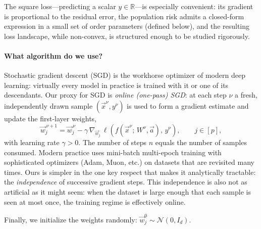 The square loss---predicting a scalar $y \in \mathbb{R}$---is especially convenient:
its gradient is proportional to the residual error, the population risk admits a
closed-form expression in a small set of order parameters (defined below), and the
resulting loss landscape, while non-convex, is structured enough to be studied
rigorously.

\paragraph{What algorithm do we use?}
Stochastic gradient descent (SGD) is the workhorse optimizer of modern deep
learning: virtually every model in practice is trained with it or one of its
descendants.
Our proxy for SGD is \emph{online (one-pass) SGD}: at each step $\nu$ a fresh,
independently drawn sample $(\vec{x}^\nu, y^\nu)$ is used to form a gradient
estimate and update the first-layer weights,
\begin{equation}
\label{eq:intro:sgd}
    \vec{w}_j^{\,\nu+1} = \vec{w}_j^{\,\nu}
    - \gamma\,\nabla_{\vec{w}_j}\,\ell\!\left(
        f(\vec{x}^\nu;\, W^\nu, \vec{a}),\, y^\nu\right),
    \qquad j \in [p],
\end{equation}
with learning rate $\gamma > 0$.
The number of steps $n$ equals the number of samples consumed.
Modern practice uses mini-batch multi-epoch training with sophisticated optimizers
(Adam, Muon, etc.) on datasets that are revisited many times.
Ours is simpler in the one key respect that makes it analytically tractable: the
\emph{independence} of successive gradient steps.
This independence is also not as artificial as it might seem: when the dataset is
large enough that each sample is seen at most once, the training regime is
effectively online.

Finally, we initialize the weights randomly: $\vec{w}_j^0 \sim \mathcal{N}(0, I_d)$.


